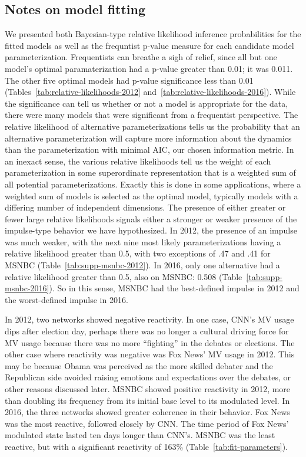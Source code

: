 \clearpage

\subsection{Notes on model fitting}

We presented both Bayesian-type relative likelihood inference probabilities
for the fitted models as well as the frequntist p-value measure for each 
candidate model parameterization. Frequentists can breathe a sigh of relief, 
since all but one model's optimal paramaterization had a p-value greater than
0.01; it was 0.011. The other five optimal models had p-value significance 
less than 0.01 (Tables~\ref{tab:relative-likelihoods-2012} 
and~\ref{tab:relative-likelihoods-2016}).  While the significance can
tell us whether or not a model is appropriate for the data, there were many 
models that were significant from a frequentist perspective. The relative
likelihood of alternative parameterizations tells us the probability that an
alternative parameterization will capture more information about the dynamics
than the parameterization with minimal AIC, our chosen information metric.
In an inexact sense, the various relative likelihoods tell us the weight of
each parameterization in some superordinate representation that is a
weighted sum of all potential parameterizations. Exactly this is done in some
applications, where a weighted sum of models is selected as the optimal model, 
typically models with a differing number of independent dimensions.
The presence of either greater or fewer large relative likelihoods signals either
a stronger or weaker presence of the impulse-type behavior we have hypothesized.
In 2012, the presence of an impulse was much weaker, with the next nine most
likely parameterizations having a relative likelihood greater than 0.5, with
two exceptions of .47 and .41 for MSNBC (Table~\ref{tab:supp-msnbc-2012}). 
In 2016, only one alternative had a relative
likelihood greater than 0.5, also on MSNBC: 0.508 
(Table~\ref{tab:supp-msnbc-2016}). So in this sense, MSNBC had the best-defined
impulse in 2012 and the worst-defined impulse in 2016.

In 2012, two networks showed negative reactivity.
In one case, CNN's MV usage dips after election
day, perhaps there was no longer a cultural driving force for MV usage
because there was no more ``fighting'' in the debates or elections. 
The other case where
reactivity was negative was Fox News' MV usage in 2012. This may be because
Obama was perceived as the more skilled debater and the Republican side 
avoided raising emotions and expectations over the debates, or other reasons
discussed later. MSNBC showed positive reactivity in 2012, 
more than doubling its frequency from its initial base level to its 
modulated level.  In 2016, the three networks showed greater coherence in their 
behavior.  Fox News was the most reactive, followed closely by CNN. The time period
of Fox News' modulated state lasted ten days longer than CNN's. MSNBC was 
the least reactive, but with a significant reactivity of 163\% 
(Table~\ref{tab:fit-parameters}).





